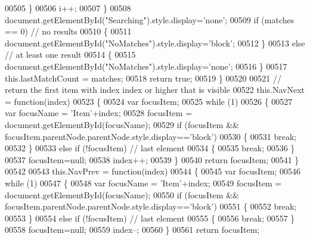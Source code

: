 \begin{DoxyCode}
00505         \}
00506         i++;
00507       \}
00508       document.getElementById(\textcolor{stringliteral}{"Searching"}).style.display=\textcolor{stringliteral}{'none'};
00509       \textcolor{keywordflow}{if} (matches == 0) \textcolor{comment}{// no results}
00510       \{
00511         document.getElementById(\textcolor{stringliteral}{"NoMatches"}).style.display=\textcolor{stringliteral}{'block'};
00512       \}
00513       \textcolor{keywordflow}{else} \textcolor{comment}{// at least one result}
00514       \{
00515         document.getElementById(\textcolor{stringliteral}{"NoMatches"}).style.display=\textcolor{stringliteral}{'none'};
00516       \}
00517       this.lastMatchCount = matches;
00518       \textcolor{keywordflow}{return} \textcolor{keyword}{true};
00519     \}
00520 
00521     \textcolor{comment}{// return the first item with index index or higher that is visible}
00522     this.NavNext = \textcolor{keyword}{function}(index)
00523     \{
00524       var focusItem;
00525       \textcolor{keywordflow}{while} (1)
00526       \{
00527         var focusName = \textcolor{stringliteral}{'Item'}+index;
00528         focusItem = document.getElementById(focusName);
00529         \textcolor{keywordflow}{if} (focusItem && focusItem.parentNode.parentNode.style.display==\textcolor{stringliteral}{'block'})
00530         \{
00531           \textcolor{keywordflow}{break};
00532         \}
00533         \textcolor{keywordflow}{else} \textcolor{keywordflow}{if} (!focusItem) \textcolor{comment}{// last element}
00534         \{
00535           \textcolor{keywordflow}{break};
00536         \}
00537         focusItem=null;
00538         index++;
00539       \}
00540       \textcolor{keywordflow}{return} focusItem;
00541     \}
00542 
00543     this.NavPrev = \textcolor{keyword}{function}(index)
00544     \{
00545       var focusItem;
00546       \textcolor{keywordflow}{while} (1)
00547       \{
00548         var focusName = \textcolor{stringliteral}{'Item'}+index;
00549         focusItem = document.getElementById(focusName);
00550         \textcolor{keywordflow}{if} (focusItem && focusItem.parentNode.parentNode.style.display==\textcolor{stringliteral}{'block'})
00551         \{
00552           \textcolor{keywordflow}{break};
00553         \}
00554         \textcolor{keywordflow}{else} \textcolor{keywordflow}{if} (!focusItem) \textcolor{comment}{// last element}
00555         \{
00556           \textcolor{keywordflow}{break};
00557         \}
00558         focusItem=null;
00559         index--;
00560       \}
00561       \textcolor{keywordflow}{return} focusItem;

\end{DoxyCode}
